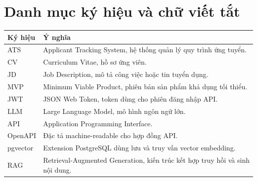 \documentclass[12pt,a4paper,oneside]{extreport}
\begin{document}
\chapter*{Danh mục ký hiệu và chữ viết tắt}
\begin{longtable}{p{}p{}}
\toprule
\textbf{Ký hiệu} & \textbf{Ý nghĩa}\\
\midrule
ATS & Applicant Tracking System, hệ thống quản lý quy trình ứng tuyển.\\
CV & Curriculum Vitae, hồ sơ ứng viên.\\
JD & Job Description, mô tả công việc hoặc tin tuyển dụng.\\
MVP & Minimum Viable Product, phiên bản sản phẩm khả dụng tối thiểu.\\
JWT & JSON Web Token, token dùng cho phiên đăng nhập API.\\
LLM & Large Language Model, mô hình ngôn ngữ lớn.\\
API & Application Programming Interface.\\
OpenAPI & Đặc tả machine-readable cho hợp đồng API.\\
pgvector & Extension PostgreSQL dùng lưu và truy vấn vector embedding.\\
RAG & Retrieval-Augmented Generation, kiến trúc kết hợp truy hồi và sinh nội dung.\\
\bottomrule
\end{longtable}

\clearpage
{}








\appendix

\end{document}
